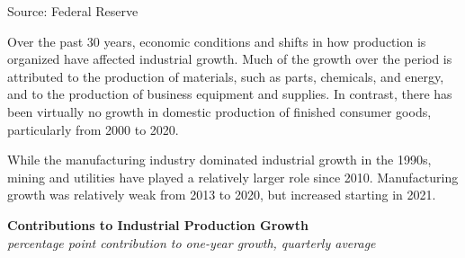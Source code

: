 \documentclass{report}
\makeatletter
\newcommand{\tbllink}[1]{\href{https://raw.githubusercontent.com/bdecon/US-chartbook/master/chartbook/data/#1}{\faTable}}
\newcommand*\short[1]{\expandafter\@gobbletwo\number\numexpr#1\relax}
\newcommand{\sbar}[4]{
		\addplot[ybar stacked, bar width=2.4pt, draw opacity=0, fill=#1] 
			table [x=#2, y=#3, col sep=comma]{#4};}
\newcommand{\dateaxisticks}{
		date coordinates in=x, axis line style={draw=none},
		xmax={2022-10-31},
		max space between ticks=40,	    
		xtick={{1990-01-01}, {1992-01-01}, {1994-01-01}, 
			{1996-01-01}, {1998-01-01}, {2000-01-01}, 
			{2002-01-01}, {2004-01-01}, {2006-01-01},
			{2008-01-01}, {2010-01-01}, {2012-01-01}, {2014-01-01},
		    {2016-01-01}, {2018-01-01}, {2020-01-01}, {2022-01-01}, 
		    {2024-01-01}, {2026-01-01}},
		minor xtick={{1989-01-01}, {1991-01-01}, {1993-01-01},
			{1995-01-01}, {1997-01-01}, {1999-01-01}, 
			{2001-01-01}, {2003-01-01}, {2005-01-01}, {2007-01-01},
		    {2009-01-01}, {2011-01-01}, {2013-01-01}, {2015-01-01},
		    {2017-01-01}, {2019-01-01}, {2021-01-01}, {2023-01-01}, 
		    {2025-01-01}, {2027-01-01}},
		enlarge y limits={0.06}, enlarge x limits={0.01},
		}
\newcommand{\bbar}[2]{extra #1 ticks = {{#2}}, extra #1 tick labels = ,
		extra #1 tick style = {grid=major, grid style={thick, black!25}},}
\newcommand{\rbars}{
		\fill[color=black!10] (axis cs:{1990-07-01},\pgfkeysvalueof{/pgfplots/ymin}) rectangle 
			(axis cs:{1991-03-01}, \pgfkeysvalueof{/pgfplots/ymax});
		\fill[color=black!10] (axis cs:{2007-12-01},\pgfkeysvalueof{/pgfplots/ymin}) rectangle 
			(axis cs:{2009-07-01}, \pgfkeysvalueof{/pgfplots/ymax});
		\fill[color=black!10] (axis cs:{2001-03-01},\pgfkeysvalueof{/pgfplots/ymin}) rectangle 
			(axis cs:{2001-11-01}, \pgfkeysvalueof{/pgfplots/ymax});
		\fill[color=black!10] (axis cs:{2020-02-01},\pgfkeysvalueof{/pgfplots/ymin}) rectangle 
			(axis cs:{2020-05-01}, \pgfkeysvalueof{/pgfplots/ymax});}
\makeatother
\begin{document}
{\begin{minipage}{0.76\textwidth}
{\footnotesize{Source: Federal Reserve} \hfill \tbllink{indpro_table.csv}}
\end{minipage}
\newpage
\begin{minipage}{0.76\textwidth}
\small Over the past 30 years, economic conditions and shifts in how production is organized have affected industrial growth. Much of the growth over the period is attributed to the production of materials, such as parts, chemicals, and energy, and to the production of business equipment and supplies. In contrast, there has been virtually no growth in domestic production of finished consumer goods, particularly from 2000 to 2020. 

While the manufacturing industry dominated industrial growth in the 1990s, mining and utilities have played a relatively larger role since 2010. Manufacturing growth was relatively weak from 2013 to 2020, but increased starting in 2021. 
\vspace{1mm}

\normalsize \textbf{Contributions to Industrial Production Growth}\\
\footnotesize{\textit{percentage point contribution to one-year growth, quarterly average}}
\vspace{2.6cm}

\hspace{4mm} 
\vspace{3.4cm}


\end{minipage}}
\end{document}

